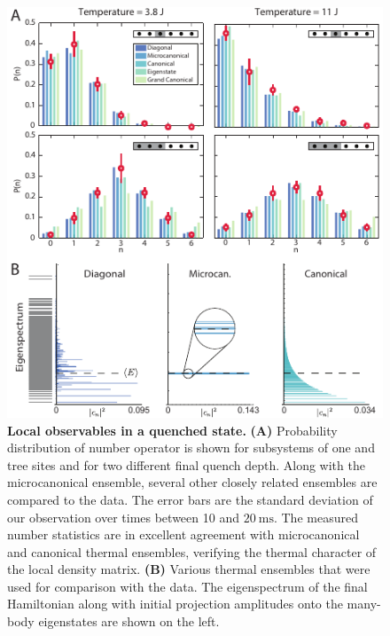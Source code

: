 \begin{figure}[t]
	\centering
	\includegraphics[scale=1.2]{figures/ETH_localDistr.pdf}
	\caption{{\bf Local observables in a quenched state. } {\bf (A)} Probability distribution of number operator is shown for subsystems of one and tree sites and for two different final quench depth. Along with the microcanonical ensemble, several other closely related ensembles are compared to the data. The error bars are the standard deviation of our observation over times between 10 and $20~\mathrm{ms}$. The measured number statistics are in excellent agreement with microcanonical and canonical thermal ensembles, verifying the thermal character of the local density matrix. {\bf (B)} Various thermal ensembles that were used for comparison with the data. The eigenspectrum of the final Hamiltonian along with initial projection amplitudes onto the many-body eigenstates are shown on the left.}
	\label{fig:ETH_Ensembles}
\end{figure}

